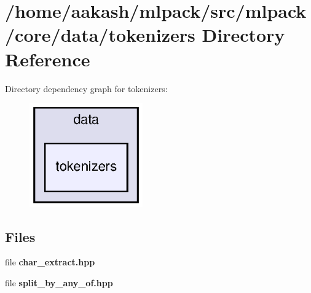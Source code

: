 \section{/home/aakash/mlpack/src/mlpack/core/data/tokenizers Directory Reference}
\label{dir_21f21f7fc6edb7b7ad73eecde282ab06}
Directory dependency graph for tokenizers\+:
\nopagebreak
\begin{figure}[H]
\begin{center}
\leavevmode
\includegraphics[width=138pt]{dir_21f21f7fc6edb7b7ad73eecde282ab06_dep}
\end{center}
\end{figure}
\subsection*{Files}
\begin{DoxyCompactItemize}
\item 
file \textbf{ char\+\_\+extract.\+hpp}
\item 
file \textbf{ split\+\_\+by\+\_\+any\+\_\+of.\+hpp}
\end{DoxyCompactItemize}

